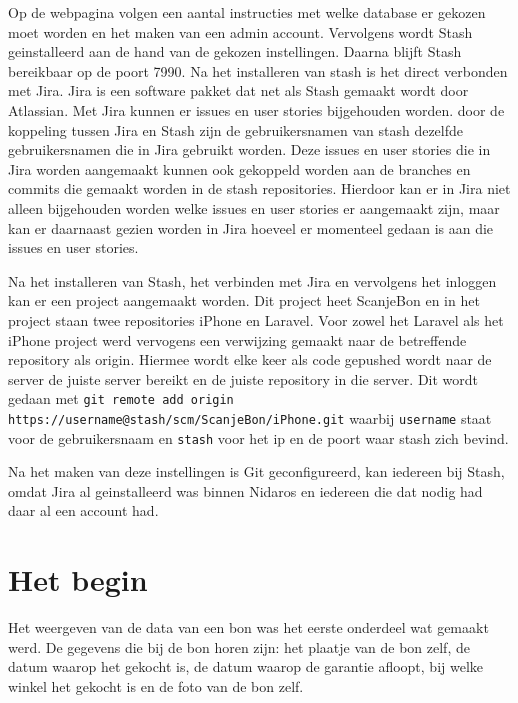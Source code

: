\documentclass[a4paper,11pt,oneside]{report}
\begin{document}
Op de webpagina volgen een aantal instructies met welke database er gekozen moet
worden en het maken van een admin account. Vervolgens wordt Stash geinstalleerd
aan de hand van de gekozen instellingen. Daarna blijft Stash bereikbaar op de
poort 7990. Na het installeren van stash is het direct verbonden met Jira. Jira
is een software pakket dat net als Stash gemaakt wordt door Atlassian. Met Jira
kunnen er issues en user stories bijgehouden worden. door de koppeling tussen
Jira en Stash zijn de gebruikersnamen van stash dezelfde gebruikersnamen die in
Jira gebruikt worden. Deze issues en user stories die in Jira worden aangemaakt
kunnen ook gekoppeld worden aan de branches en commits die gemaakt worden in de
stash repositories. Hierdoor kan er in Jira niet alleen bijgehouden worden welke
issues en user stories er aangemaakt zijn, maar kan er daarnaast gezien worden
in Jira hoeveel er momenteel gedaan is aan die issues en user stories.

Na het installeren van Stash, het verbinden met Jira en vervolgens het inloggen
kan er een project aangemaakt worden. Dit project heet ScanjeBon en in het
project staan twee repositories iPhone en Laravel. Voor zowel het Laravel als
het iPhone project werd vervogens een verwijzing gemaakt naar de betreffende
repository als origin. Hiermee wordt elke keer als code gepushed wordt naar de
server de juiste server bereikt en de juiste repository in die server. Dit wordt
gedaan met \lstinline[style=code-block]|git remote add origin https://username@stash/scm/ScanjeBon/iPhone.git|
waarbij \lstinline[style=code-block]|username| staat voor de gebruikersnaam en
\lstinline[style=code-block]|stash| voor het ip en de poort waar stash zich
bevind.

Na het maken van deze instellingen is Git geconfigureerd, kan iedereen bij
Stash, omdat Jira al geinstalleerd was binnen Nidaros en iedereen die dat nodig
had daar al een account had.


\section{Het begin}
Het weergeven van de data van een bon was het eerste onderdeel wat gemaakt werd.
De gegevens die bij de bon horen zijn: het plaatje van de bon zelf, de datum
waarop het gekocht is, de datum waarop de garantie afloopt, bij welke winkel het
gekocht is en de foto van de bon zelf.
\end{document}
